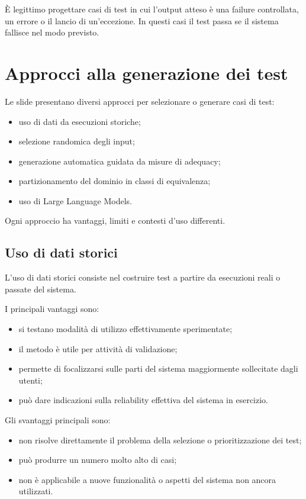 \begin{notaesame}
È legittimo progettare casi di test in cui l'output atteso è una failure controllata, un errore o il lancio di un'eccezione. In questi casi il test passa se il sistema fallisce nel modo previsto.
\end{notaesame}

\section{Approcci alla generazione dei test}

Le slide presentano diversi approcci per selezionare o generare casi di test:

\begin{itemize}
    \item uso di dati da esecuzioni storiche;
    \item selezione randomica degli input;
    \item generazione automatica guidata da misure di adequacy;
    \item partizionamento del dominio in classi di equivalenza;
    \item uso di Large Language Models.
\end{itemize}

Ogni approccio ha vantaggi, limiti e contesti d'uso differenti.

\subsection{Uso di dati storici}

L'uso di dati storici consiste nel costruire test a partire da esecuzioni reali o passate del sistema.

I principali vantaggi sono:

\begin{itemize}
    \item si testano modalità di utilizzo effettivamente sperimentate;
    \item il metodo è utile per attività di validazione;
    \item permette di focalizzarsi sulle parti del sistema maggiormente sollecitate dagli utenti;
    \item può dare indicazioni sulla reliability effettiva del sistema in esercizio.
\end{itemize}

Gli svantaggi principali sono:

\begin{itemize}
    \item non risolve direttamente il problema della selezione o prioritizzazione dei test;
    \item può produrre un numero molto alto di casi;
    \item non è applicabile a nuove funzionalità o aspetti del sistema non ancora utilizzati.
\end{itemize}

